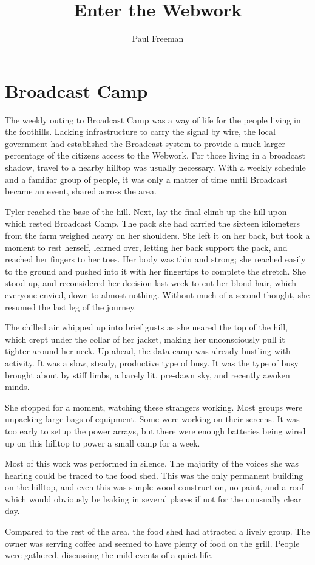 \documentclass[courier]{sffms}
\author{Paul Freeman}
\title{Enter the Webwork}
\begin{document}
\chapter{Broadcast Camp}
The weekly outing to Broadcast Camp was a way of life for
the people living in the foothills. Lacking infrastructure to
carry the signal by wire, the local government had established
the Broadcast system to provide a much larger percentage of
the citizens access to the Webwork. For those living in a
broadcast shadow, travel to a nearby hilltop was usually necessary.
With a weekly schedule and a familiar group of people, it
was only a matter of time until Broadcast became an event, shared
across the area.

Tyler reached the base of the hill. Next, lay the final 
climb up the hill upon
which rested Broadcast Camp. The pack she had carried the
sixteen kilometers from the farm weighed heavy on her shoulders.
She left it on her back, but took a
moment to rest herself, learned over,
letting her back support the pack, and reached her fingers
to her toes. Her body was thin and strong; she reached
easily to the ground and pushed into it with her fingertips
to complete the stretch. She stood up, and reconsidered
her decision last week to cut her blond hair,
which everyone envied, down to almost nothing.
Without much of a second thought, she resumed the
last leg of the journey.

The chilled air whipped up into brief gusts as she neared the top of
the hill, which crept under the collar of her jacket, making
her unconsciously pull it tighter around her neck. Up ahead, the
data camp was already bustling with activity. It was a slow,
steady, productive type of busy. It was the type of busy brought
about by stiff limbs, a barely lit, pre-dawn sky, and recently
awoken minds.

She stopped for a moment, watching these strangers working. Most
groups were unpacking large bags of equipment. Some were working
on their screens. It was too early to setup the power arrays,
but there were enough batteries being wired up on this hilltop
to power a small camp for a week.

Most of this work was performed in silence. The majority of the
voices she was hearing could be traced to the food shed. This
was the only permanent building on the hilltop, and even this
was simple wood construction, no paint, and a roof which would
obviously be leaking in several places if not for the unusually
clear day.

Compared to the rest of the area, the food shed had attracted a
lively group. The owner was serving coffee and seemed to have
plenty of food on the grill. People were gathered, discussing
the mild events of a quiet life.
\end{document}
